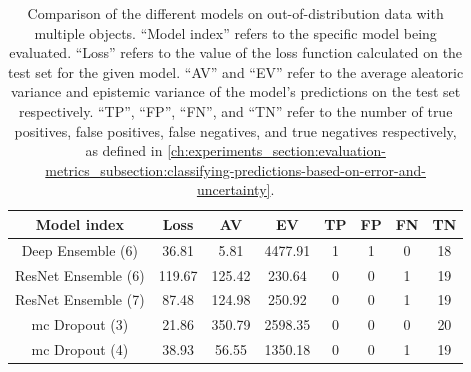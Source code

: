 \begin{table}[ht]
    \centering
    \begin{tabular}{c !{\vrule width 2pt} c|c|c|c|c|c|c}
        \textbf{Model index} & \textbf{Loss} & \textbf{AV} & \textbf{EV} & \textbf{TP} & \textbf{FP} & \textbf{FN} & \textbf{TN} \\
        \hline
        Deep Ensemble (6) & 36.81 & 5.81 & 4477.91 & 1 & 1 & 0 & 18 \\
        ResNet Ensemble (6) & 119.67 & 125.42 & 230.64 & 0 & 0 & 1 & 19 \\
        ResNet Ensemble (7) & 87.48 & 124.98 & 250.92 & 0 & 0 & 1 & 19 \\
        \gls{mc} Dropout (3) & 21.86 & 350.79 & 2598.35 & 0 & 0 & 0 & 20 \\
        \gls{mc} Dropout (4) & 38.93 & 56.55 & 1350.18 & 0 & 0 & 1 & 19 \\
    \end{tabular}
    \caption[Comparison of the different models on out-of-distribution data with multiple objects.]{
        Comparison of the different models on out-of-distribution data with multiple objects.
        ``Model index'' refers to the specific model being evaluated.
        ``Loss'' refers to the value of the loss function calculated on the test set for the given model.
        ``AV'' and ``EV'' refer to the average aleatoric variance and epistemic variance of the model's predictions on the test set respectively.
        ``TP'', ``FP'', ``FN'', and ``TN'' refer to the number of true positives, false positives, false negatives, and true negatives respectively, as defined in \cref{ch:experiments_section:evaluation-metrics_subsection:classifying-predictions-based-on-error-and-uncertainty}.
        }
    \label{tab:models_comparison_out-of-distribution-multiple-objects}
\end{table}

